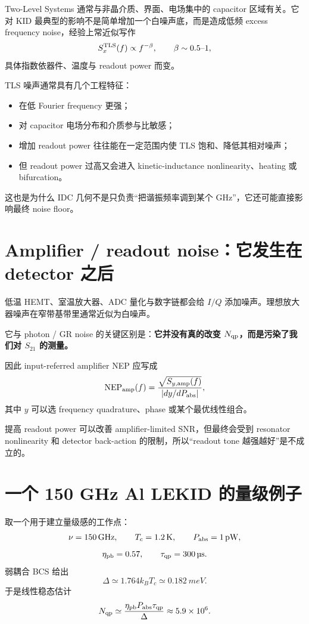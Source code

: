 \documentclass[11pt,a4paper,openany]{ctexrep}
\begin{document}
Two-Level Systems 通常与非晶介质、界面、电场集中的 capacitor 区域有关。它对 KID 最典型的影响不是简单增加一个白噪声底，而是造成低频 excess frequency noise，经验上常近似写作
\[
S_x^{\rm TLS}(f)\propto f^{-\beta},
\qquad \beta\sim 0.5\text{--}1,
\]
具体指数依器件、温度与 readout power 而变。

TLS 噪声通常具有几个工程特征：
\begin{itemize}
  \item 在低 Fourier frequency 更强；
  \item 对 capacitor 电场分布和介质参与比敏感；
  \item 增加 readout power 往往能在一定范围内使 TLS 饱和、降低其相对噪声；
  \item 但 readout power 过高又会进入 kinetic-inductance nonlinearity、heating 或 bifurcation。
\end{itemize}

这也是为什么 IDC 几何不是只负责“把谐振频率调到某个 GHz”，它还可能直接影响最终 noise floor。

\section{Amplifier / readout noise：它发生在 detector 之后}

低温 HEMT、室温放大器、ADC 量化与数字链都会给 $I/Q$ 添加噪声。理想放大器噪声在窄带基带里通常近似为白噪声。

它与 photon / GR noise 的关键区别是：\textbf{它并没有真的改变 $N_{\rm qp}$，而是污染了我们对 $S_{21}$ 的测量。}

因此 input-referred amplifier NEP 应写成
\[
\mathrm{NEP}_{\rm amp}(f)
=
\frac{\sqrt{S_{y,\rm amp}(f)}}
{|dy/dP_{\rm abs}|},
\]
其中 $y$ 可以选 frequency quadrature、phase 或某个最优线性组合。

提高 readout power 可以改善 amplifier-limited SNR，但最终会受到 resonator nonlinearity 和 detector back-action 的限制，所以“readout tone 越强越好”是不成立的。

\section{一个 150 GHz Al LEKID 的量级例子}

取一个用于建立量级感的工作点：
\[
\nu=\SI{150}{GHz},\qquad
T_c=\SI{1.2}{K},\qquad
P_{\rm abs}=\SI{1}{pW},
\]
\[
\eta_{\rm pb}=0.57,\qquad
\tau_{\rm qp}=\SI{300}{\micro s}.
\]
弱耦合 BCS 给出
\[
\Delta\simeq1.764k_BT_c\simeq\SI{0.182}{meV}.
\]
于是线性稳态估计
\[
N_{\rm qp}
\simeq
\frac{\eta_{\rm pb}P_{\rm abs}\tau_{\rm qp}}{\Delta}
\approx 5.9\times10^6.
\]
\end{document}
